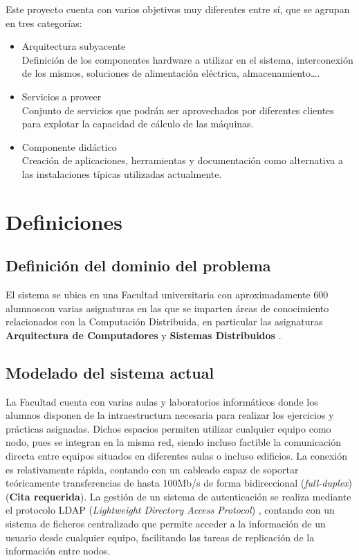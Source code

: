 Este proyecto cuenta con varios objetivos muy diferentes entre sí, que se agrupan en tres categorías:
\begin{itemize}
  \item Arquitectura subyacente\\
  Definición de los componentes hardware a utilizar en el sistema, interconexión de los mismos, soluciones de alimentación eléctrica, almacenamiento\dots.
  \item Servicios a proveer\\
  Conjunto de servicios que podrán ser aprovechados por diferentes clientes para explotar la capacidad de cálculo de las máquinas.
  \item Componente didáctico\\
  Creación de aplicaciones, herramientas y documentación como alternativa a las instalaciones típicas utilizadas actualmente.
\end{itemize}

\section{Definiciones}

\subsection{Definición del dominio del problema}

El sistema se ubica en una Facultad universitaria con aproximadamente 600 alumnos\citationneeded con varias asignaturas en las que se imparten áreas de conocimiento relacionados con la Computación Distribuida, en particular las asignaturas \textbf{Arquitectura de Computadores} y \textbf{Sistemas Distribuidos} \cite{DIA15GuiaAcademica}.

\subsection{Modelado del sistema actual}

La Facultad cuenta con varias aulas y laboratorios informáticos donde los alumnos disponen de la intraestructura necesaria para realizar los ejercicios y prácticas asignadas. Dichos espacios permiten utilizar cualquier equipo como nodo, pues se integran en la misma red, siendo incluso factible la comunicación directa entre equipos situados en diferentes aulas o incluso edificios. La conexión es relativamente rápida, contando con un cableado capaz de soportar teóricamente transferencias de hasta 100Mb/s de forma bidireccional (\textit{full-duplex}) (\textbf{Cita requerida}). La gestión de un sistema de autenticación se realiza mediante el protocolo LDAP (\textit{Lightweight Directory Access Protocol}) \cite{RFC4516-comment}, contando con un sistema de ficheros centralizado que permite acceder a la información de un usuario desde cualquier equipo, facilitando las tareas de replicación de la información entre nodos.

